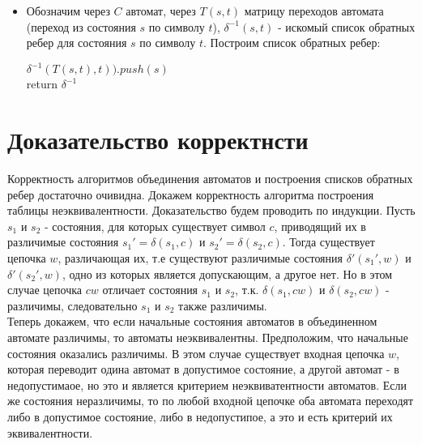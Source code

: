 \documentclass[12pt]{article}
\begin{document}
\begin{itemize}
\item Обозначим через $C$ автомат, через $T(s,t)$ матрицу переходов автомата (переход из состояния $s$ по символу $t$), $\delta^{-1}(s,t)$ - искомый список обратных ребер для состояния $s$ по символу $t$. Построим список обратных ребер:

\begin{algorithmic}[1]
					\State $\delta^{-1}(T(s,t), t)).push(s)$
				\EndIf
			\EndFor
		\EndFor\\
	\State return $\delta^{-1}$
	\EndProcedure
\end{algorithmic}	

	
\end{itemize}
	



\section{Доказательство корректнсти}
Корректность алгоритмов объединения автоматов и построения списков обратных ребер достаточно очивидна. Докажем корректность алгоритма построения таблицы неэквивалентности. Доказательство будем проводить по индукции. Пусть $s_1$ и $s_2$ - состояния, для которых существует символ $c$, приводящий их в различимые состояния $s_{1}' = \delta(s_1,c)$ и $s_{2}' = \delta(s_2,c)$. Тогда существует цепочка $w$, различающая их, т.е существуют различимые состояния $\delta'(s_{1}',w)$ и $\delta'(s_{2}',w)$, одно из которых является допускающим, а другое нет. Но в этом случае цепочка $cw$ отличает состояния $s_1$ и $s_2$, т.к. $\delta(s_1,cw)$ и $\delta(s_2,cw)$ - различимы, следовательно $s_1$ и $s_2$ также различимы.\\
Теперь докажем, что если начальные состояния автоматов в объединенном автомате различимы, то автоматы неэквивалентны. Предположим, что начальные состояния оказались различимы. В этом случае существует входная цепочка $w$, которая переводит одина автомат в допустимое состояние, а другой автомат - в недопустимаое, но это и является критерием неэквиватентности автоматов. Если же состояния неразличимы, то по любой входной цепочке оба автомата переходят либо в допустимое состояние, либо в недопустипое, а это и есть критерий их эквивалентности.
\end{document}
